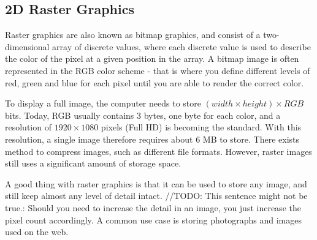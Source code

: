 \subsection{2D Raster Graphics}
Raster graphics are also known as bitmap graphics, and consist of a two-dimensional array of discrete values, where each discrete value is used to describe the color of the pixel at a given position in the array.
A bitmap image is often represented in the RGB color scheme - that is where you define different levels of red, green and blue for each pixel until you are able to render the correct color.

To display a full image, the computer needs to store \( (width \times height) \times RGB \) bits.
Today, RGB usually contains 3 bytes, one byte for each color, and a resolution of \(1920 \times 1080\) pixels (Full HD) is becoming the standard.
With this resolution, a single image therefore requires about 6 MB to store.
There exists method to compress images, such as different file formats. 
However, raster images still uses a significant amount of storage space.

A good thing with raster graphics is that it can be used to store any image, and still keep almost any level of detail intact. 
//TODO: This sentence might not be true.: Should you need to increase the detail in an image, you just increase the pixel count accordingly. 
A common use case is storing photographs and images used on the web. 